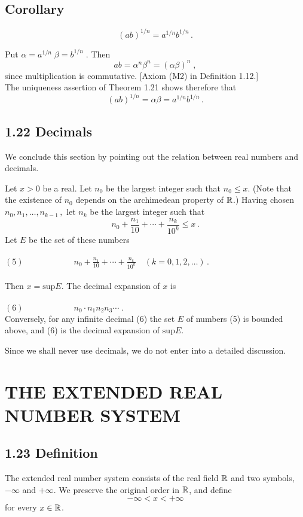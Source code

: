 \subsection*{Corollary}
 $${(ab)}^{1/n} = a^{1/n} b^{1/n}\,.$$

\:\:\: Put $\alpha = a^{1/n}\; \beta = b^{1/n}\;$. Then
$$ab = \alpha^n \beta^n = {(\alpha \beta)}^n\;,$$ 
since multiplication is commutative. [Axiom (M2) in Definition 1.12.]\\
The uniqueness assertion of Theorem 1.21 shows therefore that 
$${(ab)}^{1/n} = \alpha \beta = a^{1/n} b^{1/n}\,.$$  


\subsection*{1.22 Decimals}
We conclude this section by pointing out the relation between real numbers and decimals. 

Let $x > 0$ be a real. Let $n_0$ be the largest integer such that $n_0 \leq x$. 
(Note that the existence of $n_0$ depends on the archimedean property of $\mathbb{R}$.)
Having chosen $n_0, n_1, \ldots, n_{k-1}\,,$ let $n_k$ be the largest integer such that 
$$ n_0 + \frac{n_1}{10} + \cdots + \frac{n_k}{10^k} \leq x\,.$$
Let $E$ be the set of these numbers\\
 \\
$(5)\quad\quad\quad\quad\quad\quad n_0 + \frac{n_1}{10} + \cdots + \frac{n_k}{10^k} \quad (k = 0, 1, 2, \ldots)\,.$ \\
 \\
Then $x = \text{sup} E$. The decimal expansion of $x$ is\\
 \\
$(6)\quad\quad\quad\quad\quad\quad n_0 \cdot n_1 n_2 n_3 \cdots\;.$\\

Conversely, for any infinite decimal (6) the set $E$ of numbers (5) is bounded above, and (6) is the decimal 
expansion of $\text{sup} E$.

Since we shall never use decimals, we do not enter into a detailed discussion.


\section*{THE EXTENDED REAL NUMBER SYSTEM}

\subsection*{1.23 Definition}
The extended real number system consists of the real field $\mathbb{R}$ and two symbols, $- \infty$ and $+ \infty$. We preserve the original order in $\mathbb{R}$, and define 
$$ - \infty < x < + \infty$$
for every $x \in \mathbb{R}$.

